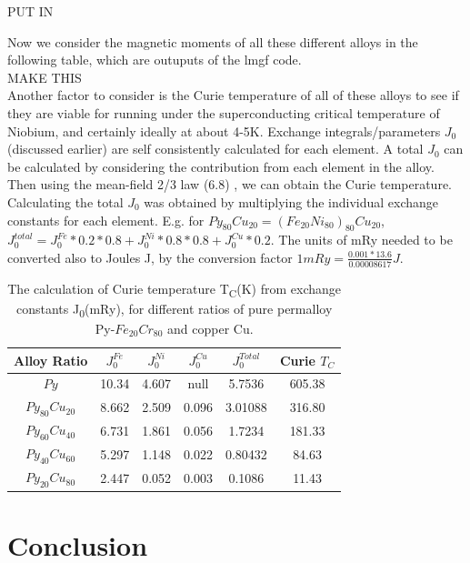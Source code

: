 \documentclass[12pt]{article}
\begin{document}
PUT IN

Now we consider the magnetic moments of all these different alloys in the following table, which are outuputs of the lmgf code.
\\ 
MAKE THIS
\\
\clearpage
Another factor to consider is the Curie temperature of all of these alloys to see if they are viable for running under the superconducting critical temperature of Niobium, and certainly ideally at about 4-5K. Exchange integrals/parameters $J_0$ (discussed earlier) are self consistently calculated for each element. A total $J_0$ can be calculated by considering the contribution from each element in the alloy. Then using the mean-field 2/3 law (6.8) , we can obtain the Curie temperature. Calculating the total $J_0$ was obtained by multiplying the individual exchange constants for each element. E.g. for $Py_{80}Cu_{20}=(Fe_{20}Ni_{80})_{80}Cu_{20}$, $J_0^{total}=J_0^{Fe}*0.2*0.8+J_0^{Ni}*0.8*0.8+J_0^{Cu}*0.2$. The units of mRy needed to be converted also to Joules J, by the conversion factor $1mRy=\frac{0.001*13.6}{0.00008617}J$.
\begin{table}[h!]
\centering
 \begin{tabular}{||c c c c c c||} 
 \hline
 Alloy Ratio & $J_0^{Fe}$ & $J_0^{Ni}$ & $J_0^{Cu}$ & $J_0^{Total}$ & Curie $T_C$ \\ [1ex] 
 \hline\hline
 $Py$ & 10.34 & 4.607 & null & 5.7536 & 605.38 \\ 
 $Py_{80}Cu_{20}$ & 8.662 & 2.509 & 0.096 & 3.01088 & 316.80 \\
 $Py_{60}Cu_{40}$ & 6.731 & 1.861 & 0.056 & 1.7234 & 181.33 \\
 $Py_{40}Cu_{60}$ & 5.297 & 1.148 & 0.022 & 0.80432 & 84.63 \\
 $Py_{20}Cu_{80}$ & 2.447 & 0.052 & 0.003 & 0.1086 & 11.43 \\ [1ex] 
 \hline
 \end{tabular}
\caption{The calculation of Curie temperature T\textsubscript{C}(K) from exchange constants J\textsubscript{0}(mRy), for different ratios of pure permalloy Py-$Fe_{20}Cr_{80}$ and copper Cu.} 
\end{table}





\section{Conclusion}



\clearpage
\printbibliography
\end{document}
